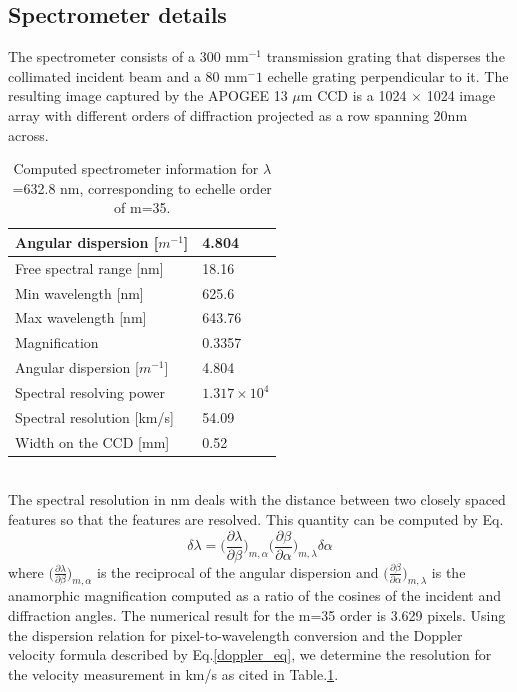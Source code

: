 \documentclass[authoryear, 12pt,5p, times]{elsarticle}
\begin{document}
\subsection{Spectrometer details}
The spectrometer consists of a 300 mm$^{-1}$ transmission grating that disperses the collimated incident beam and a 80 mm${^-1}$ echelle grating 
 perpendicular to it. The resulting image captured by the APOGEE 13 $\mu$m CCD is a 1024 $\times$ 1024 image array with different orders of diffraction projected as a row spanning 20nm across. 
\hspace{-20pt}
\begin{table}
    \begin{tabular}{|l|l}
    \hline Angular dispersion [$m^{-1}$]  & 4.804                     \\ \hline     \hline Free spectral range [nm]           & 18.16                     \\     \hline Min wavelength [nm]  & 625.6
 \\  \hline  Max wavelength [nm]  &  643.76 
 \\ \hline Magnification   & 0.3357                
 \\ \hline  \hline     Angular dispersion [$m^{-1}$]  & 4.804                   \\ \hline   Spectral resolving power  & $1.317\times10^4$\\ 
    \hline Spectral resolution [km/s]   & 54.09        \\ 
   \hline Width on the CCD [mm]   & 0.52                      \\
    \end{tabular}
  
    \caption{Computed spectrometer information for $\lambda $=632.8 nm, corresponding to echelle order of  m=35. }
  \label{spec_prop}\end{table}
 \\The spectral resolution in nm deals with the distance between two closely spaced features so that the features are resolved. This quantity can be computed by Eq.\label{spectral_resolution}
\begin{equation}
\delta\lambda=\Bigg(\frac{\partial\lambda}{\partial\beta}\Bigg)_{m,\alpha}\Bigg(\frac{\partial\beta}{\partial\alpha}\Bigg)_{m,\lambda}\delta\alpha
\label{spectral_resolution}
\end{equation}
where $\Big(\frac{\partial\lambda}{\partial\beta}\Big)_{m,\alpha}$ is the reciprocal of the angular dispersion and $\Big(\frac{\partial\beta}{\partial\alpha}\Big)_{m,\lambda}$ is the anamorphic magnification computed as a ratio of the cosines of the incident and diffraction angles. The numerical result for the m=35 order is 3.629 pixels. Using the dispersion relation for pixel-to-wavelength conversion and the Doppler velocity formula described by Eq.\ref{doppler_eq}, we determine the resolution for the velocity measurement in km/s as cited in Table.\ref{spec_prop}.
\end{document}
